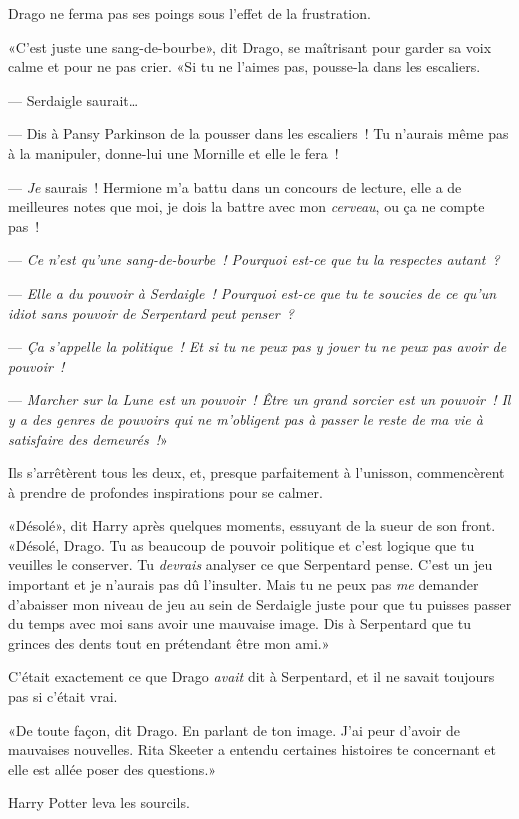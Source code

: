 Drago ne ferma pas ses poings sous l'effet de la frustration.

«C'est juste une sang-de-bourbe», dit Drago, se maîtrisant pour garder sa voix calme et pour ne pas crier. «Si tu ne l'aimes pas, pousse-la dans les escaliers.

--- Serdaigle saurait…

--- Dis à Pansy Parkinson de la pousser dans les escaliers~! Tu n'aurais même pas à la manipuler, donne-lui une Mornille et elle le fera~!

--- \emph{Je} saurais~! Hermione m'a battu dans un concours de lecture, elle a de meilleures notes que moi, je dois la battre avec mon \emph{cerveau}, ou ça ne compte pas~!

--- \emph{Ce n'est qu'une sang-de-bourbe~! Pourquoi est-ce que tu la respectes autant~?}

--- \emph{Elle a du pouvoir à Serdaigle~! Pourquoi est-ce que tu te soucies de ce qu'un idiot sans pouvoir de Serpentard peut penser~?}

--- \emph{Ça s'appelle la politique~! Et si tu ne peux pas y jouer tu ne peux pas avoir de pouvoir~!}

--- \emph{Marcher sur la Lune est un pouvoir~! Être un grand sorcier est un pouvoir~! Il y a des genres de pouvoirs qui ne m'obligent pas à passer le reste de ma vie à satisfaire des demeurés~!}»

Ils s'arrêtèrent tous les deux, et, presque parfaitement à l'unisson, commencèrent à prendre de profondes inspirations pour se calmer.

«Désolé», dit Harry après quelques moments, essuyant de la sueur de son front. «Désolé, Drago. Tu as beaucoup de pouvoir politique et c'est logique que tu veuilles le conserver. Tu \emph{devrais} analyser ce que Serpentard pense. C'est un jeu important et je n'aurais pas dû l'insulter. Mais tu ne peux pas \emph{me} demander d'abaisser mon niveau de jeu au sein de Serdaigle juste pour que tu puisses passer du temps avec moi sans avoir une mauvaise image. Dis à Serpentard que tu grinces des dents tout en prétendant être mon ami.»

C'était exactement ce que Drago \emph{avait} dit à Serpentard, et il ne savait toujours pas si c'était vrai.

«De toute façon, dit Drago. En parlant de ton image. J'ai peur d'avoir de mauvaises nouvelles. Rita Skeeter a entendu certaines histoires te concernant et elle est allée poser des questions.»

Harry Potter leva les sourcils.


